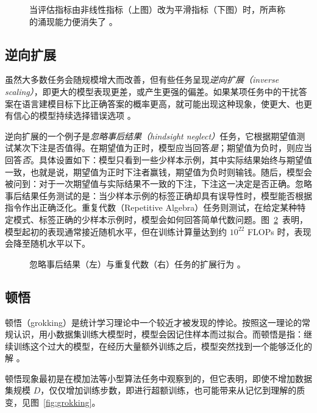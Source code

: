 \begin{figure}
    \centering
    
    \caption{当评估指标由非线性指标（上图）改为平滑指标（下图）时，所声称的涌现能力便消失了 \citep{schaeffer2023emergent}。}
    \label{fig:emergent}
\end{figure}

\subsection{逆向扩展}
虽然大多数任务会随规模增大而改善，但有些任务呈现\emph{逆向扩展（inverse scaling）}，即更大的模型表现更差，或产生更强的偏差。如果某项任务中的干扰答案在语言建模目标下比正确答案的概率更高，就可能出现这种现象，使更大、也更有信心的模型持续选择错误选项 \citep{mckenzie2023inverse, michaelov-bergen-2023-emergent}。

逆向扩展的一个例子是\emph{忽略事后结果（hindsight neglect）}任务，它根据期望值测试某次下注是否值得。在期望值为正时，模型应当回答{\em 是}；期望值为负时，则应当回答{\em 否}。具体设置如下：模型只看到一些少样本示例，其中实际结果始终与期望值一致，也就是说，期望值为正时下注者赢钱，期望值为负时则输钱。随后，模型会被问到：对于一次期望值与实际结果不一致的下注，下注这一决定是否正确。忽略事后结果任务测试的是：当少样本示例的标签正确却具有误导性时，模型能否根据指令作出正确泛化。重复代数（Repetitive Algebra）任务则测试，在给定某种特定模式、标签正确的少样本示例时，模型会如何回答简单代数问题。图~\ref{fig:negative-scaling}~表明，模型起初的表现通常接近随机水平，但在训练计算量达到约 $10^{22}$ FLOPs 时，表现会降至随机水平以下。

\begin{figure}
    \centering
    
    \caption{忽略事后结果（左）与重复代数（右）任务的扩展行为 \citep{mckenzie2023inverse}。}
    \label{fig:negative-scaling}
\end{figure}

\subsection{顿悟}
顿悟（grokking）是统计学习理论中一个较近才被发现的悖论。按照这一理论的常规认识，用小数据集训练大模型时，模型会因记住样本而过拟合。而顿悟是指：继续训练这个过大的模型，在经历大量额外训练之后，模型突然找到一个能够泛化的解 \citep{power2022grokkinggeneralizationoverfittingsmall}。

顿悟现象最初是在模加法等小型算法任务中观察到的，但它表明，即使不增加数据集规模 $D$，仅仅增加训练步数，即进行超额训练，也可能带来从记忆到理解的质变，见图~\ref{fig:grokking}。

